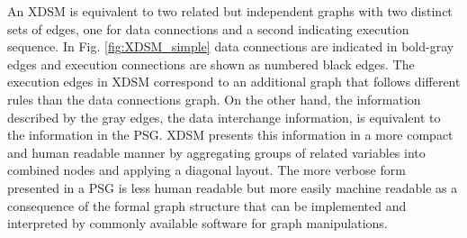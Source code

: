 An XDSM is equivalent to two related but independent graphs with two distinct sets of edges, one for data 
connections and a second indicating execution sequence. In Fig. \ref{fig:XDSM_simple}
data connections are indicated in bold-gray edges and execution connections are shown as numbered black edges. The
execution edges in XDSM correspond to an additional graph that
follows different rules than the data connections graph. 
On the other hand, the information described by the gray edges, 
the data interchange information, is equivalent to the information in the PSG. XDSM presents this 
information in a more compact and human readable manner by aggregating groups of related variables
into combined nodes and applying a diagonal layout. The more verbose form presented in a 
PSG is less human readable but more easily machine readable as a consequence of the formal 
graph structure that can be implemented and interpreted by commonly available software 
for graph manipulations. 



